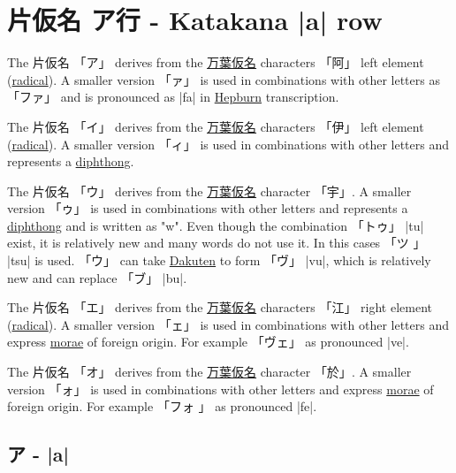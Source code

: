 \section{片仮名 ア行 - Katakana |a| row}


 The 片仮名 {「ア」} derives from the
\hyperref[sec:Manyogana]{万葉仮名} characters {「阿」} left element
(\hyperref[sec:Radical]{radical}).  A smaller version {「ァ」} is used in
combinations with other letters as {「ファ」} and is pronounced as |fa| in
\hyperref[sec:Hepburn]{Hepburn} transcription.

 The 片仮名 {「イ」} derives from the
\hyperref[sec:Manyogana]{万葉仮名} characters {「伊」} left element
(\hyperref[sec:Radical]{radical}).  A smaller version {「ィ」} is used in
combinations with other letters and represents a
\hyperref[sec:Diphthong]{diphthong}. 

 The 片仮名 {「ウ」} derives from the
\hyperref[sec:Manyogana]{万葉仮名} character {「宇」}. A smaller version
{「ゥ」} is used in combinations with other letters and represents a
\hyperref[sec:Diphthong]{diphthong} and is written as "w". Even though the
combination {「トゥ」} |tu| exist, it is relatively new and many words do not
use it. In this cases {「ツ 」} |tsu| is used. {「ウ」} can take
\hyperref[sec:Dakuten]{Dakuten} to form {「ヴ」} |vu|, which is relatively new
and can replace {「ブ」} |bu|. 

\newpage 

 The 片仮名 {「エ」} derives from the
\hyperref[sec:Manyogana]{万葉仮名} characters {「江」} right element
(\hyperref[sec:Radical]{radical}). A smaller version {「ェ」} is used in
combinations with other letters and express \hyperref[sec:Mora]{morae} of
foreign origin. For example {「ヴェ」} as pronounced |ve|.

 The 片仮名 {「オ」} derives from the
\hyperref[sec:Manyogana]{万葉仮名} character {「於」}. A smaller version
{「ォ」} is used in combinations with other letters and express
\hyperref[sec:Mora]{morae} of foreign origin. For example {「フォ 」} as
pronounced |fe|.

\newpage


\subsection{ア - |a|} \label{sec:KatakanaA}

